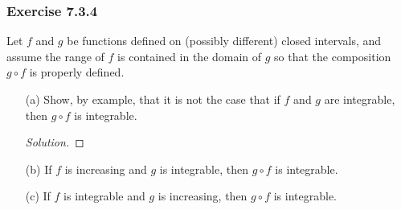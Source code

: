 \subsubsection{Exercise 7.3.4} Let \( f  \) and \( g  \) be functions defined on (possibly different) closed intervals, and assume the range of \( f  \) is contained in the domain of \( g  \) so that the composition \( g \circ f   \) is properly defined.
\begin{enumerate}
    \item[(a)] Show, by example, that it is not the case that if \( f  \) and \( g  \) are integrable, then \( g \circ f  \) is integrable.
		\begin{proof}[Solution]
		
		\end{proof}

	\item[(b)] If \( f  \) is increasing and \( g  \) is integrable, then \( g \circ f  \) is integrable.
		
	\item[(c)] If \( f  \) is integrable and \( g  \) is increasing, then \( g \circ f  \) is integrable.
\end{enumerate}



